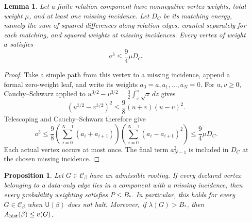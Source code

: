 \documentclass[10pt]{article}
\numberwithin{equation}{section}
\newtheorem{lemma}[lemma]{Lemma}\aliascntresetthe{lemma}
\newtheorem{proposition}[proposition]{Proposition}\aliascntresetthe{proposition}
\theoremstyle{definition}
\begin{document}
\begin{lemma}
\label{lem:ternary-grounded-eight}
Let a finite relation component have nonnegative vertex weights, total weight $\mu$, and at least one missing incidence. Let $D_C$ be its matching energy, namely the sum of squared differences along relation edges, counted separately for each matching, and squared weights at missing incidences. Every vertex of weight $a$ satisfies
\[
 a^3\le\frac94\mu D_C.
\]
\end{lemma}
\begin{proof}
Take a simple path from this vertex to a missing incidence, append a formal zero-weight leaf, and write its weights $a_0=a,a_1,\ldots,a_N=0$. For $u,v\ge0$, Cauchy--Schwarz applied to $u^{3/2}-v^{3/2}=\tfrac32\int_v^u\sqrt z\,dz$ gives
\[
 (u^{3/2}-v^{3/2})^2\le\frac98(u+v)(u-v)^2.
\]
Telescoping and Cauchy--Schwarz therefore give
\[
 a^3\le\frac98
 \left(\sum_{i=0}^{N-1}(a_i+a_{i+1})\right)
 \left(\sum_{i=0}^{N-1}(a_i-a_{i+1})^2\right)
 \le\frac94\mu D_C.
\]
Each actual vertex occurs at most once. The final term $a_{N-1}^2$ is included in $D_C$ at the chosen missing incidence.
\end{proof}
\begin{proposition}
\label{prop:ternary-marker-nonhalting-bound}
Let $G\in\mathcal C_\beta$ have an admissible rooting. If every declared vertex belonging to a data-only edge lies in a component with a missing incidence, then every probability weighting satisfies $P\le B_*$. In particular, this holds for every $G\in\mathcal C_\beta$ when $\mathsf U(\beta)$ does not halt. Moreover, if $\lambda(G)>B_*$, then $A_{\rm hist}(\beta)\le v(G)$.
\end{proposition}
\end{document}
